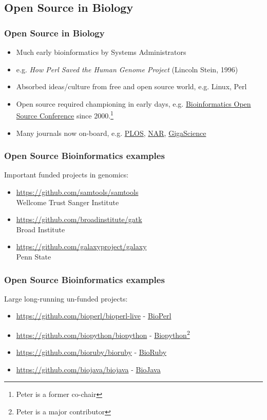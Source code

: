 \subsection{Open Source in Biology}

\begin{frame}
  \frametitle{Open Source in Biology}
  \begin{itemize}
    \item Much early bioinformatics by Systems Administrators
    \item e.g. \emph{How Perl Saved the Human Genome Project} (Lincoln Stein, 1996)
    \item Absorbed ideas/culture from free and open source world, e.g. Linux, Perl
    \item Open source required championing in early days, e.g. \href{https://www.open-bio.org/wiki/BOSC}{Bioinformatics Open Source Conference} since 2000.\footnote{Peter is a former co-chair}
    \item Many journals now on-board, e.g.
    \href{http://journals.plos.org/plosone/s/materials-and-software-sharing}{PLOS},
    \href{https://academic.oup.com/nar/pages/Policies}{NAR},
    \href{https://academic.oup.com/gigascience/pages/editorial_policies_and_reporting_standards}{GigaScience}
  \end{itemize}
\end{frame}

\begin{frame}
  \frametitle{Open Source Bioinformatics examples}
  Important funded projects in genomics:
  \begin{itemize}
    \item \url{https://github.com/samtools/samtools} \\ Wellcome Trust Sanger Institute
    \item \url{https://github.com/broadinstitute/gatk} \\ Broad Institute
    \item \url{https://github.com/galaxyproject/galaxy} \\ Penn State
  \end{itemize}
\end{frame}

\begin{frame}
  \frametitle{Open Source Bioinformatics examples}
  Large long-running un-funded projects:
  \begin{itemize}
    \item \url{https://github.com/bioperl/bioperl-live} - \href{http://bioperl.org}{BioPerl}
    \item \url{https://github.com/biopython/biopython} - \href{http://biopython.org}{Biopython}\footnote{Peter is a major contributor}
    \item \url{https://github.com/bioruby/bioruby} - \href{http://bioruby.org}{BioRuby}
    \item \url{https://github.com/biojava/biojava} - \href{http://biojava.org}{BioJava}
  \end{itemize}
\end{frame}


